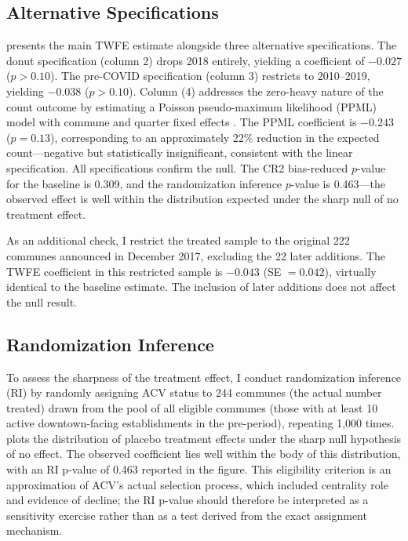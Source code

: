 \documentclass[12pt]{article}
\begin{document}
\subsection{Alternative Specifications}

 presents the main TWFE estimate alongside three alternative specifications. The donut specification (column 2) drops 2018 entirely, yielding a coefficient of $-0.027$ ($p > 0.10$). The pre-COVID specification (column 3) restricts to 2010--2019, yielding $-0.038$ ($p > 0.10$). Column (4) addresses the zero-heavy nature of the count outcome by estimating a Poisson pseudo-maximum likelihood (PPML) model with commune and quarter fixed effects \citep{silva2006log}. The PPML coefficient is $-0.243$ ($p = 0.13$), corresponding to an approximately 22\% reduction in the expected count---negative but statistically insignificant, consistent with the linear specification. All specifications confirm the null. The CR2 bias-reduced $p$-value for the baseline is 0.309, and the randomization inference $p$-value is 0.463---the observed effect is well within the distribution expected under the sharp null of no treatment effect.

As an additional check, I restrict the treated sample to the original 222 communes announced in December 2017, excluding the 22 later additions. The TWFE coefficient in this restricted sample is $-0.043$ (SE $= 0.042$), virtually identical to the baseline estimate. The inclusion of later additions does not affect the null result.



\subsection{Randomization Inference}

To assess the sharpness of the treatment effect, I conduct randomization inference (RI) by randomly assigning ACV status to 244 communes (the actual number treated) drawn from the pool of all eligible communes (those with at least 10 active downtown-facing establishments in the pre-period), repeating 1,000 times.  plots the distribution of placebo treatment effects under the sharp null hypothesis of no effect. The observed coefficient lies well within the body of this distribution, with an RI p-value of 0.463 reported in the figure. This eligibility criterion is an approximation of ACV's actual selection process, which included centrality role and evidence of decline; the RI p-value should therefore be interpreted as a sensitivity exercise rather than as a test derived from the exact assignment mechanism.
\end{document}

